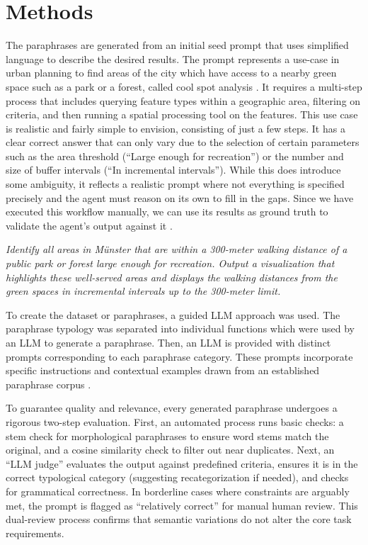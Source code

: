 \section{Methods}
\label{sec:methods}

The paraphrases are generated from an initial seed prompt that uses simplified language to
describe the desired results. The prompt represents a use-case in urban planning to find areas of
the city which have access to a nearby green space such as a park or a forest, called cool spot
analysis \citep{kluck2022}. It requires a multi-step process that includes querying feature types
within a geographic area, filtering on criteria, and then running a spatial processing tool on
the features. This use case is realistic and fairly simple to envision, consisting of just a few
steps. It has a clear correct answer that can only vary due to the selection of certain
parameters such as the area threshold (``Large enough for recreation'') or the number and size
of buffer intervals (``In incremental intervals''). While this does introduce some ambiguity, it
reflects a realistic prompt where not everything is specified precisely and the agent must
reason on its own to fill in the gaps. Since we have executed this workflow manually, we can use
its results as ground truth to validate the agent's output against it \citep{voigtlaender2022}.

\emph{Identify all areas in Münster that are within a 300-meter walking distance of a public park
or forest large enough for recreation. Output a visualization that highlights these well-served
areas and displays the walking distances from the green spaces in incremental intervals up to
the 300-meter limit.}

To create the dataset or paraphrases, a guided LLM approach was used. The paraphrase typology
was separated into individual functions which were used by an LLM to generate a paraphrase.
Then, an LLM is provided with distinct prompts corresponding to each paraphrase category. These
prompts incorporate specific instructions and contextual examples drawn from an established
paraphrase corpus \citep{kovatchev2018}.

To guarantee quality and relevance, every generated paraphrase undergoes a rigorous two-step
evaluation. First, an automated process runs basic checks: a stem check for morphological
paraphrases to ensure word stems match the original, and a cosine similarity check to filter out
near duplicates. Next, an ``LLM judge'' evaluates the output against predefined criteria, ensures
it is in the correct typological category (suggesting recategorization if needed), and checks
for grammatical correctness. In borderline cases where constraints are arguably met, the prompt
is flagged as ``relatively correct'' for manual human review. This dual-review process confirms
that semantic variations do not alter the core task requirements.

